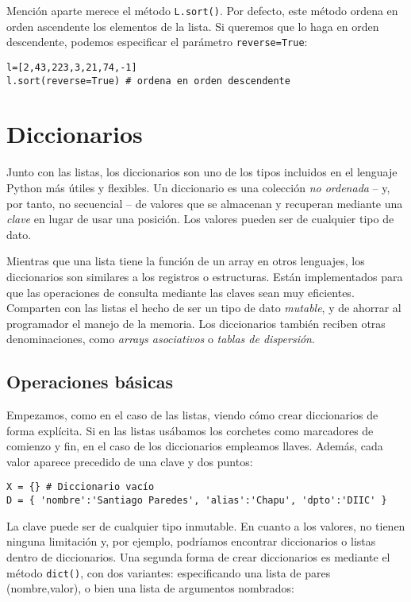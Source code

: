 Mención aparte merece el método \texttt{L.sort()}. Por defecto, este método ordena en orden ascendente los elementos de la lista. Si queremos que lo haga en orden descendente, podemos especificar el parámetro \texttt{reverse=True}:

\begin{lstlisting}
l=[2,43,223,3,21,74,-1]
l.sort(reverse=True) # ordena en orden descendente
\end{lstlisting}


\section{Diccionarios}\label{sec:diccionarios}

Junto con las listas, los diccionarios son uno de los tipos incluidos en el lenguaje Python más útiles y flexibles. Un diccionario es una colección \emph{no ordenada} -- y, por tanto, no secuencial -- de valores que se almacenan y recuperan mediante una \emph{clave} en lugar de usar una posición. Los valores pueden ser de cualquier tipo de dato.

Mientras que una lista tiene la función de un array en otros lenguajes, los diccionarios son similares a los registros o estructuras. Están implementados para que las operaciones de consulta mediante las claves sean muy eficientes. Comparten con las listas el hecho de ser un tipo de dato \emph{mutable}, y de ahorrar al programador el manejo de la memoria. Los diccionarios también reciben otras denominaciones, como \emph{arrays asociativos} o \emph{tablas de dispersión}. 

\subsection{Operaciones básicas}

Empezamos, como en el caso de las listas, viendo cómo crear diccionarios de forma explícita. Si en las listas usábamos los corchetes como marcadores de comienzo y fin, en el caso de los diccionarios empleamos llaves. Además, cada valor aparece precedido de una clave y dos puntos:

\begin{lstlisting}
X = {} # Diccionario vacío
D = { 'nombre':'Santiago Paredes', 'alias':'Chapu', 'dpto':'DIIC' }
\end{lstlisting}

La clave puede ser de cualquier tipo inmutable. En cuanto a los valores, no tienen ninguna limitación y, por ejemplo, podríamos encontrar diccionarios o listas dentro de diccionarios. Una segunda forma de crear diccionarios es mediante el método \texttt{dict()}, con dos variantes: especificando una lista de pares (nombre,valor), o bien una lista de argumentos nombrados:

